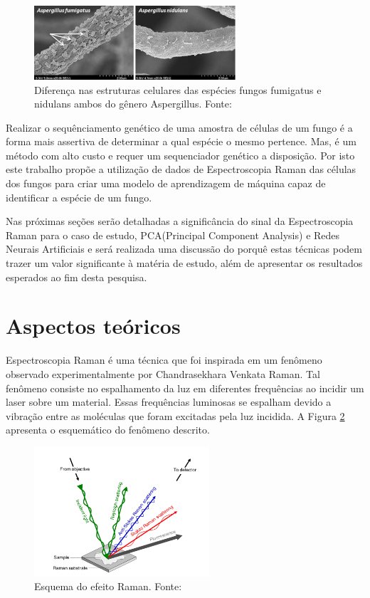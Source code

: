 \documentclass[conference,peerreview]{IEEEtran}
\begin{document}
\begin{figure}[ht]
\centering
\includegraphics[width=7.5cm]{fungus_dif}
\caption{Diferença nas estruturas celulares das espécies fungos fumigatus e nidulans ambos do gênero Aspergillus. Fonte: \cite{Lee2015}}
\label{fg_exemp1}
\end{figure}

Realizar o sequênciamento genético de uma amostra de células de um fungo é a forma mais assertiva de determinar a qual espécie o mesmo pertence. Mas, é um método com alto custo e requer um sequenciador genético a disposição. Por isto este trabalho propõe a utilização de dados de Espectroscopia Raman das células dos fungos para criar uma modelo de aprendizagem de máquina capaz de identificar a espécie de um fungo.

Nas próximas seções serão detalhadas a significância do sinal da Espectroscopia Raman para o caso de estudo, PCA(Principal Component Analysis) e Redes Neurais Artificiais e será realizada uma discussão do porquê estas técnicas podem trazer um valor significante à matéria de estudo, além de apresentar os resultados esperados ao fim desta pesquisa.

\section{Aspectos teóricos}

Espectroscopia Raman é uma técnica que foi inspirada em um fenômeno observado experimentalmente por Chandrasekhara Venkata Raman. Tal fenômeno consiste no espalhamento da luz em diferentes frequências ao incidir um laser sobre um material. Essas frequências luminosas se espalham devido a vibração entre as moléculas que foram excitadas pela luz incidida. A Figura \ref{fg_exemp2} apresenta o esquemático do fenômeno descrito.

\begin{figure}[ht]
\centering
\includegraphics[width=6.5cm]{incidencia_luminosa_exemplo}
\caption{Esquema do efeito Raman. Fonte: \cite{Butler2016}}
\label{fg_exemp2}
\end{figure}
\end{document}
